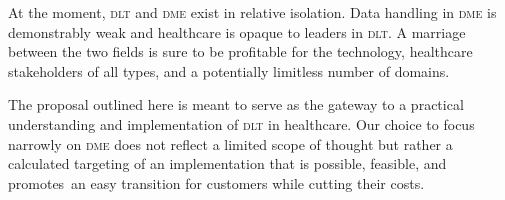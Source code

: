   At the moment, \textsc{dlt} and \textsc{dme} exist in relative isolation. Data handling in \textsc{dme} is demonstrably weak and healthcare is opaque to leaders in \textsc{dlt}. A marriage between the two fields is sure to be profitable for the technology, healthcare stakeholders of all types, and a potentially limitless number of domains.%

  The proposal outlined here is meant to serve as the gateway to a practical understanding and implementation of \textsc{dlt} in healthcare. Our choice to focus narrowly on \textsc{dme} does not reflect a limited scope of thought but rather a calculated targeting of an implementation that is possible, feasible, and promotes an easy transition for customers while cutting their costs.%
